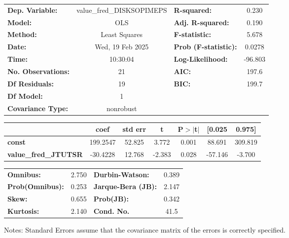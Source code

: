 \begin{center}
\begin{tabular}{lclc}
\toprule
\textbf{Dep. Variable:}      & value\_fred\_DISKSOPIMEPS & \textbf{  R-squared:         } &     0.230   \\
\textbf{Model:}              &            OLS            & \textbf{  Adj. R-squared:    } &     0.190   \\
\textbf{Method:}             &       Least Squares       & \textbf{  F-statistic:       } &     5.678   \\
\textbf{Date:}               &      Wed, 19 Feb 2025     & \textbf{  Prob (F-statistic):} &   0.0278    \\
\textbf{Time:}               &          10:30:04         & \textbf{  Log-Likelihood:    } &   -96.803   \\
\textbf{No. Observations:}   &               21          & \textbf{  AIC:               } &     197.6   \\
\textbf{Df Residuals:}       &               19          & \textbf{  BIC:               } &     199.7   \\
\textbf{Df Model:}           &                1          & \textbf{                     } &             \\
\textbf{Covariance Type:}    &         nonrobust         & \textbf{                     } &             \\
\bottomrule
\end{tabular}
\begin{tabular}{lcccccc}
                             & \textbf{coef} & \textbf{std err} & \textbf{t} & \textbf{P$> |$t$|$} & \textbf{[0.025} & \textbf{0.975]}  \\
\midrule
\textbf{const}               &     199.2547  &       52.825     &     3.772  &         0.001        &       88.691    &      309.819     \\
\textbf{value\_fred\_JTUTSR} &     -30.4228  &       12.768     &    -2.383  &         0.028        &      -57.146    &       -3.700     \\
\bottomrule
\end{tabular}
\begin{tabular}{lclc}
\textbf{Omnibus:}       &  2.750 & \textbf{  Durbin-Watson:     } &    0.389  \\
\textbf{Prob(Omnibus):} &  0.253 & \textbf{  Jarque-Bera (JB):  } &    2.147  \\
\textbf{Skew:}          &  0.655 & \textbf{  Prob(JB):          } &    0.342  \\
\textbf{Kurtosis:}      &  2.140 & \textbf{  Cond. No.          } &     41.5  \\
\bottomrule
\end{tabular}
\end{center}

Notes: \newline
 [1] Standard Errors assume that the covariance matrix of the errors is correctly specified.